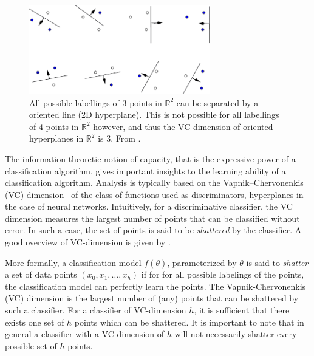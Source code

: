 \documentclass[thesis]{subfiles}
\begin{document}
    \begin{figure}
        \centering
        \includegraphics[width=0.7\textwidth]{Figs/PDF/vcdim_r2lines}
        \caption{All possible labellings of 3 points in $\mathbb{R}^2$ can be separated by a oriented line (2D hyperplane). This is not possible for all labellings of 4 points in $\mathbb{R}^2$ however, and thus the VC dimension of oriented hyperplanes in $\mathbb{R}^2$ is 3. From \citet{burges1998tutorial}.}
        \label{fig:vcdim_r2line}
    \end{figure}
    The information theoretic notion of capacity, that is the expressive power of a classification algorithm, gives important insights to the learning ability of a classification algorithm. Analysis is typically based on the Vapnik–Chervonenkis (VC) dimension~\citep{vapnik2015uniform} of the class of functions used as discriminators, \eg hyperplanes in the case of neural networks. Intuitively, for a discriminative classifier, the VC dimension measures the largest number of points that can be classified without error. In such a case, the set of points is said to be \emph{shattered} by the classifier. A good overview of VC-dimension is given by \citet{burges1998tutorial}.
    
    More formally, a classification model $f(\theta)$, parameterized by $\theta$ is said to \emph{shatter} a set of data points $(x_0, x_1, \ldots, x_h)$ if for for all possible labelings of the points, the classification model can perfectly learn the points. The Vapnik-Chervonenkis (VC) dimension is the largest number of (any) points that can be shattered by such a classifier. For a classifier of VC-dimension $h$, it is sufficient that there exists one set of $h$ points which can be shattered. It is important to note that in general a classifier with a VC-dimension of $h$ will not necessarily shatter every possible set of $h$ points. 
    
\end{document}

